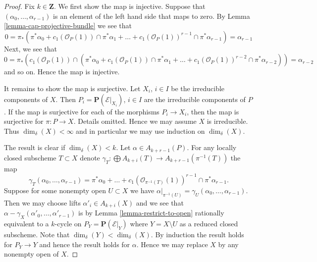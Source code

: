 \begin{proof}
Fix $k \in \mathbf{Z}$. We first show the map is injective.
Suppose that $(\alpha_0, \ldots, \alpha_{r - 1})$ is an element
of the left hand side that maps to zero.
By Lemma \ref{lemma-cap-projective-bundle} we see that
$$
0 = \pi_*(\pi^*\alpha_0 +
c_1(\mathcal{O}_P(1)) \cap \pi^*\alpha_1
+ \ldots +
c_1(\mathcal{O}_P(1))^{r - 1} \cap \pi^*\alpha_{r-1})
= \alpha_{r - 1}
$$
Next, we see that
$$
0 = \pi_*(c_1(\mathcal{O}_P(1)) \cap (\pi^*\alpha_0 +
c_1(\mathcal{O}_P(1)) \cap \pi^*\alpha_1
+ \ldots +
c_1(\mathcal{O}_P(1))^{r - 2} \cap \pi^*\alpha_{r - 2}))
= \alpha_{r - 2}
$$
and so on. Hence the map is injective.

\medskip\noindent
It remains to show the map is surjective.
Let $X_i$, $i \in I$ be the irreducible components of $X$.
Then $P_i = \mathbf{P}(\mathcal{E}|_{X_i})$, $i \in I$
are the irreducible components of $P$.
If the map is surjective for each of the morphisms
$P_i \to X_i$, then the map is
surjective for $\pi : P \to X$.
Details omitted. Hence we may assume $X$ is irreducible.
Thus $\dim_\delta(X) < \infty$ and in particular we may use
induction on $\dim_\delta(X)$.

\medskip\noindent
The result is clear if $\dim_\delta(X) < k$.
Let $\alpha \in A_{k + r - 1}(P)$.
For any locally closed subscheme $T \subset X$ denote
$\gamma_T : \bigoplus A_{k + i}(T) \to A_{k + r - 1}(\pi^{-1}(T))$
the map
$$
\gamma_T(\alpha_0, \ldots, \alpha_{r - 1})
= \pi^*\alpha_0 + \ldots +
c_1(\mathcal{O}_{\pi^{-1}(T)}(1))^{r - 1} \cap \pi^*\alpha_{r - 1}.
$$
Suppose for some nonempty open $U \subset X$ we have
$\alpha|_{\pi^{-1}(U)} = \gamma_U(\alpha_0, \ldots, \alpha_{r - 1})$.
Then we may choose lifts $\alpha'_i \in A_{k + i}(X)$ and we
see that $\alpha - \gamma_X(\alpha'_0, \ldots, \alpha'_{r - 1})$
is by Lemma \ref{lemma-restrict-to-open}
rationally equivalent to a $k$-cycle on $P_Y = \mathbf{P}(\mathcal{E}|_Y)$
where $Y = X \setminus U$ as a reduced closed subscheme.
Note that $\dim_\delta(Y) < \dim_\delta(X)$.
By induction the result holds
for $P_Y \to Y$ and hence the result holds for $\alpha$.
Hence we may replace $X$ by any nonempty open of $X$.


\end{proof}
